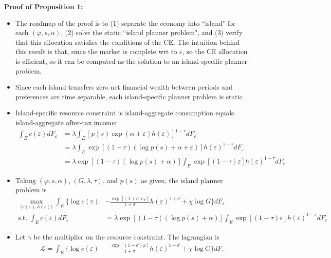 \documentclass{article}
\newcommand{\Lfn}{\mathcal{L}}
\begin{document}
\bigskip



\textbf{Proof of Proposition 1:} 

\begin{itemize}
\item The roadmap of the proof is to (1) separate the economy into ``island" for each $(\varphi, s, \alpha)$, (2) solve the static ``island planner problem", and (3) verify that this allocation satisfies the conditions of the CE. The intuition behind this result is that, since the market is complete wrt to $\varepsilon$, so the CE allocation is efficient, so it can be computed as the solution to an island-specific planner problem. 
\item Since each island transfers zero net financial wealth between periods and preferences are time separable, each island-specific planner problem is static.
\item Island-specific resource constraint is island-aggregate consumption equals island-aggregate after-tax income:
\begin{align*}
\int_E c(\varepsilon) dF_\varepsilon 
&= \lambda \int_E [ p(s)\exp (\alpha + \varepsilon) h(\varepsilon)]^{1-\tau} dF_\varepsilon\\
&= \lambda \int_E \exp [(1-\tau)(\log p(s)+ \alpha + \varepsilon)] h(\varepsilon)^{1-\tau} dF_\varepsilon\\
&= \lambda \exp [(1-\tau)(\log p(s)+ \alpha)] \int_E \exp [(1-\tau) \varepsilon] h(\varepsilon)^{1-\tau} dF_\varepsilon
\end{align*}
\item Taking $(\varphi, s, \alpha)$, $(G, \lambda, \tau)$, and $p(s)$ as given, the island planner problem is
\begin{align*}
\max_{\{c(\varepsilon), h(\varepsilon)\}} \int_E \Bigg\{ \log c(\varepsilon) &- \frac{\exp[(1+\sigma)\varphi]}{1 + \sigma} h(\varepsilon)^{1+\sigma} + \chi \log G \Bigg\} dF_\varepsilon\\
\text{s.t. } \int_E c(\varepsilon) dF_\varepsilon 
&= \lambda \exp [(1-\tau)(\log p(s)+ \alpha)] \int_E \exp [(1-\tau) \varepsilon] h(\varepsilon)^{1-\tau} dF_\varepsilon
\end{align*}
\item Let $\gamma$ be the multiplier on the resource constraint. The lagrangian is
\begin{align*}
\Lfn = \int_E \Bigg\{ \log c(\varepsilon) &- \frac{\exp[(1+\sigma)\varphi]}{1 + \sigma} h(\varepsilon)^{1+\sigma} + \chi \log G \Bigg\} dF_\varepsilon \\

\end{align*}
\end{itemize}
\end{document}
